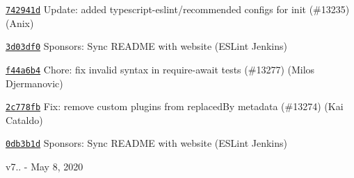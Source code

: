 \begin{DoxyItemize}
\item \href{https://github.com/eslint/eslint/commit/742941d7fdc3fd79ff8c5d2588413e0d3a5a525b}{\texttt{ {\ttfamily 742941d}}} Update\+: added typescript-\/eslint/recommended configs for init (\#13235) (Anix)
\item \href{https://github.com/eslint/eslint/commit/3d03df08c8000403a85baffe2a000287f3335114}{\texttt{ {\ttfamily 3d03df0}}} Sponsors\+: Sync README with website (ESLint Jenkins)
\item \href{https://github.com/eslint/eslint/commit/f44a6b4fd92602af8e2c75d5852f796ec064aa8e}{\texttt{ {\ttfamily f44a6b4}}} Chore\+: fix invalid syntax in require-\/await tests (\#13277) (Milos Djermanovic)
\item \href{https://github.com/eslint/eslint/commit/2c778fb6e31b7943bb27a47a6e15dcbfd8336f39}{\texttt{ {\ttfamily 2c778fb}}} Fix\+: remove custom plugins from replaced\+By metadata (\#13274) (Kai Cataldo)
\item \href{https://github.com/eslint/eslint/commit/0db3b1d5cc5e4e1de21462679581b7a4d89ff36e}{\texttt{ {\ttfamily 0db3b1d}}} Sponsors\+: Sync README with website (ESLint Jenkins)
\end{DoxyItemize}

v7.. -\/ May 8, 2020


